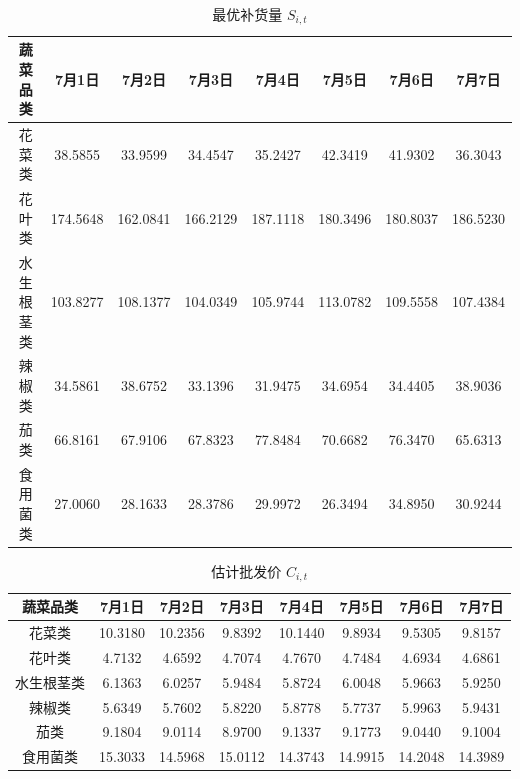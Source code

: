 \documentclass{cumcmthesis}
\begin{document}
\begin{table}[htbp]
    \centering
    \caption{最优补货量 $S_{i,t}$}
    \begin{tabular}{cccccccc}
        \hline
        蔬菜品类  & 7月1日 & 7月2日 & 7月3日 & 7月4日 & 7月5日 & 7月6日 & 7月7日 \\
        \hline
        花菜类  &   38.5855 & 33.9599 & 34.4547 & 35.2427 & 42.3419 & 41.9302 & 36.3043 \\
        花叶类   &  174.5648 & 162.0841 & 166.2129 & 187.1118 & 180.3496 & 180.8037 & 186.5230 \\
        水生根茎类 &   103.8277 & 108.1377 & 104.0349 & 105.9744 & 113.0782 & 109.5558 & 107.4384 \\
        辣椒类  &   34.5861 & 38.6752 & 33.1396 & 31.9475 & 34.6954 & 34.4405 & 38.9036 \\
        茄类   &  66.8161 & 67.9106 & 67.8323 & 77.8484 & 70.6682 & 76.3470 & 65.6313 \\
        食用菌类  &   27.0060 & 28.1633 & 28.3786 & 29.9972 & 26.3494 & 34.8950 & 30.9244 \\
        \hline
    \end{tabular}
\end{table}

\begin{table}[htbp]
    \centering
    \caption{估计批发价 $C_{i,t}$}
    \begin{tabular}{cccccccc}
        \hline
        蔬菜品类  & 7月1日 & 7月2日 & 7月3日 & 7月4日 & 7月5日 & 7月6日 & 7月7日 \\
        \hline
        花菜类  & 10.3180 & 10.2356 & 9.8392 & 10.1440 & 9.8934 & 9.5305 & 9.8157 \\
        花叶类   & 4.7132 & 4.6592 & 4.7074 & 4.7670 & 4.7484 & 4.6934 & 4.6861 \\
        水生根茎类 & 6.1363 & 6.0257 & 5.9484 & 5.8724 & 6.0048 & 5.9663 & 5.9250 \\
        辣椒类  & 5.6349 & 5.7602 & 5.8220 & 5.8778 & 5.7737 & 5.9963 & 5.9431 \\
        茄类   &9.1804 & 9.0114 & 8.9700 & 9.1337 & 9.1773 & 9.0440 & 9.1004 \\
        食用菌类  &15.3033 & 14.5968 & 15.0112 & 14.3743 & 14.9915 & 14.2048 & 14.3989 \\
        \hline
    \end{tabular}
\end{table}
\end{document}
